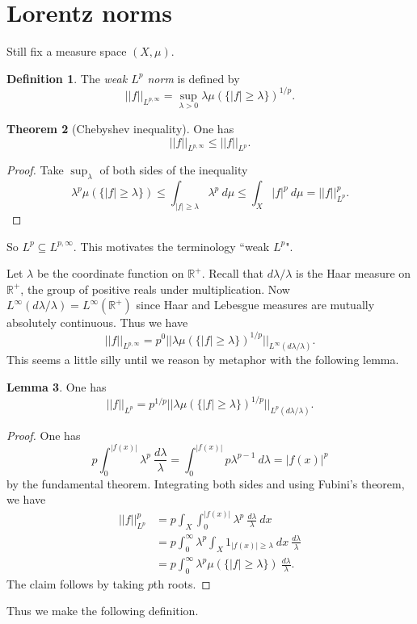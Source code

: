 \documentclass[12pt]{report}
\newcommand{\RR}{\mathbb{R}}
\newcommand{\dfn}[1]{\emph{#1}\index{#1}}
\theoremstyle{definition}
\newtheorem{theorem}{Theorem}[chapter]
\newtheorem{lemma}[theorem]{Lemma}
\newtheorem{definition}[theorem]{Definition}
\begin{document}
\section{Lorentz norms}
Still fix a measure space $(X, \mu)$.
\begin{definition}
The \dfn{weak $L^p$ norm} is defined by
$$||f||_{L^{p,\infty}} = \sup_{\lambda > 0} \lambda \mu(\{|f| \geq \lambda\})^{1/p}.$$
\end{definition}
\begin{theorem}[Chebyshev inequality]
One has
$$||f||_{L^{p,\infty}} \leq ||f||_{L^p}.$$
\end{theorem}
\begin{proof}
Take $\sup_\lambda$ of both sides of the inequality
$$\lambda^p \mu(\{|f| \geq \lambda\}) \leq \int_{|f| \geq \lambda} \lambda^p~d\mu \leq \int_X |f|^p ~d\mu = ||f||_{L^p}^p.$$
\end{proof}
So $L^p \subseteq L^{p,\infty}$. This motivates the terminology ``weak $L^p$".

Let $\lambda$ be the coordinate function on $\RR^+$. Recall that $d\lambda/\lambda$ is the Haar measure on $\RR^+$, the group of positive reals under multiplication.
Now $L^\infty(d\lambda/\lambda) = L^\infty(\RR^+)$ since Haar and Lebesgue measures are mutually absolutely continuous. Thus we have
$$||f||_{L^{p,\infty}} = p^0||\lambda \mu(\{|f| \geq \lambda\})^{1/p}||_{L^\infty(d\lambda/\lambda)}.$$
This seems a little silly until we reason by metaphor with the following lemma.
\begin{lemma}
One has
$$||f||_{L^p} = p^{1/p}||\lambda \mu(\{|f| \geq \lambda\})^{1/p}||_{L^p(d\lambda/\lambda)}.$$
\end{lemma}
\begin{proof}
One has
$$p\int_0^{|f(x)|} \lambda^p ~\frac{d\lambda}{\lambda} = \int_0^{|f(x)|} p\lambda^{p-1} ~d\lambda = |f(x)|^p$$
by the fundamental theorem. Integrating both sides and using Fubini's theorem, we have
\begin{align*}||f||_{L^p}^p &= p\int_X \int_0^{|f(x)|} \lambda^p ~\frac{d\lambda}{\lambda}~dx \\
&= p\int_0^\infty \lambda^p \int_X 1_{|f(x)| \geq \lambda} ~dx~\frac{d\lambda}{\lambda} \\
&= p\int_0^\infty \lambda^p \mu(\{|f| \geq \lambda\}) ~\frac{d\lambda}{\lambda}.
\end{align*}
The claim follows by taking $p$th roots.
\end{proof}
Thus we make the following definition.
\end{document}
